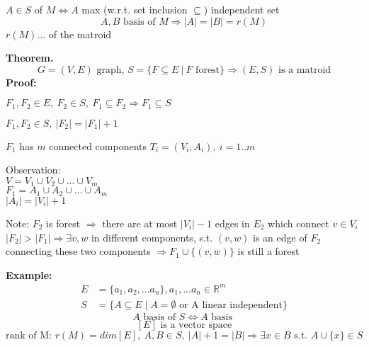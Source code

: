 \begin{definition}
	$A\in S$  of $M \Leftrightarrow A$ max (w.r.t. set inclusion $\subseteq$) independent set
	\[
	A, B \text{ basis of } M \Rightarrow |A| = |B| = r(M)
	\]
	$r(M)$...  of the matroid
\end{definition}

\textbf{Theorem.}
\[G=(V,E) \text{ graph, }S=\{F\subseteq E ~|~ F \text{ forest}\} \Rightarrow (E,S) \text{ is a matroid}\]
\textbf{Proof:}
\begin{compactenum}[(1)]
	\item{$F_1, F_2 \in E,~F_2\in S,~F_1\subseteq F_2\Rightarrow F_1\subseteq S$}
	\item{$F_1, F_2\in S, ~|F_2| = |F_1| + 1$}
	\item{$F_1$} has $m$ connected components $T_i=(V_i, A_i),~i=1..m$
	\item{Observation: \\
	$V=V_1\cup V_2\cup ... \cup V_m$\\
	$F_1 = A_1\cup A_2\cup ... \cup A_m$\\
	$|A_i|=|V_i|+1$}
	\item{}
	\item{Note: $F_2$ is forest $\Rightarrow$ there are at most $|V_i|-1$ edges in $E_2$ which connect $v\in V_i$ $|F_2| > |F_1| \Rightarrow \exists v,w $ in different components, s.t. $(v,w)$ is an edge of $F_2$ connecting these two components $\Rightarrow F_1\cup\{(v,w)\}$ is still a forest}
\end{compactenum}


\textbf{Example:}
\begin{align*}
  E &= \{a_1, a_2, ... a_n\}, a_1, ... a_n \in \mathbb{R}^m\\
  S &= \{A\subseteq E ∣ A=\emptyset \text{ or A linear independent}\}
\end{align*}
\[A \text{ basis of } S \Leftrightarrow A \text{ basis }
\]
\[
	[E] \text{ is a vector space}
\]
\[
	\text{rank of M: } r(M) = dim[E],~A,B\in S,~|A|+1=|B|\Rightarrow \exists x\in B \text{ s.t. } A\cup \{x\}\in S
\]

